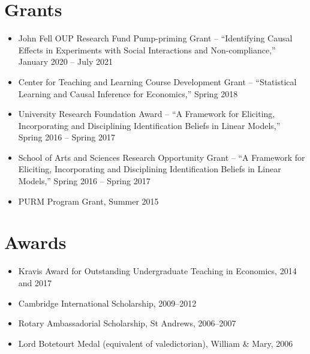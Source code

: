\documentclass[line,overlapped]{myres}
\begin{document}
\begin{resume}
\section{\sc Grants}
\begin{itemize}
  \item John Fell OUP Research Fund Pump-priming Grant -- ``Identifying Causal Effects in Experiments with Social Interactions and Non-compliance,'' January 2020 -- July 2021 %
  \item Center for Teaching and Learning Course Development Grant -- ``Statistical Learning and Causal Inference for Economics,'' Spring 2018 %
  \item University Research Foundation Award -- ``A Framework for Eliciting, Incorporating and Disciplining Identification Beliefs in Linear Models,'' Spring 2016 -- Spring 2017 %
  \item School of Arts and Sciences Research Opportunity Grant -- ``A Framework for Eliciting, Incorporating and Disciplining Identification Beliefs in Linear Models,'' Spring 2016 -- Spring 2017  %
  \item PURM Program Grant, Summer 2015 %
\end{itemize}




\section{\sc Awards}
\vspace{1em}
\begin{itemize}
\item Kravis Award for Outstanding Undergraduate Teaching in Economics, 2014 and 2017
\item Cambridge International Scholarship, 2009--2012
\item Rotary Ambassadorial Scholarship, St Andrews, 2006--2007
\item Lord Botetourt Medal (equivalent of valedictorian), William \& Mary, 2006
\end{itemize}


\end{resume}
\end{document}
